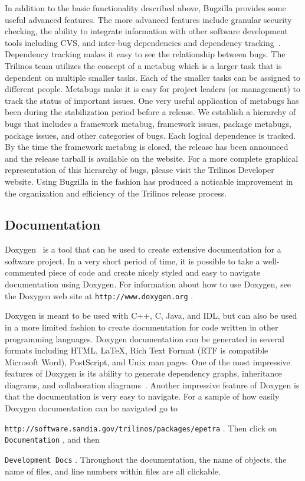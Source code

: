 \documentclass[12pt,relax]{article}
\newcommand{\InlineDirectory}[1]{
  {\hspace{0.01 in}} {\tt #1} {\hspace{0.01 in}}}
\begin{document}
In addition to the basic functionality described above, Bugzilla provides some 
useful advanced features.  The more advanced features include
granular security checking, the ability to integrate information with 
other software development tools including CVS, and inter-bug 
dependencies and dependency tracking~\cite{Bugzilla}.  Dependency tracking 
makes it easy to see the relationship 
between bugs.  The Trilinos team utilizes the concept of a metabug which 
is a larger task that is dependent on multiple smaller tasks.  Each of the 
smaller tasks can be assigned to different people. Metabugs make it is easy 
for project leaders (or management) to track the status of important issues. 
One very useful application of metabugs has been during the stabilization
period before a release.  We establish a hierarchy of bugs that includes
a framework metabug, framework issues, package metabugs, package issues,
and other categories of bugs.  
Each logical dependence is tracked.  By the time the framework metabug is 
closed, the release has been announced and the release tarball is available
on the website.  For a more complete graphical representation of this
hierarchy of bugs, please visit the Trilinos Developer website.  Using
Bugzilla in the fashion has produced a noticable improvement in the 
organization and efficiency of the Trilinos release process.

\subsection{Documentation}

Doxygen~\cite{Doxygen} is a tool that can be used to create 
extensive documentation for a software project.  In a very short period of 
time, it is possible to take a well-commented piece 
of code and create nicely styled and easy to navigate documentation using 
Doxygen.  For information about how to use 
Doxygen, see the Doxygen 
web site at \InlineDirectory{http://www.doxygen.org}.  

Doxygen is meant to be used with C++, C, Java, and IDL, but can also be used 
in a more limited fashion to create documentation for code written in other
programming languages.  Doxygen documentation 
can be generated in several formats including HTML, \LaTeX, Rich Text Format 
(RTF is compatible Microsoft Word), PostScript, and
Unix man pages.  One of the most impressive features of Doxygen is its ability 
to generate dependency graphs, inheritance diagrams, and collaboration 
diagrams~\cite{Doxygen}.  Another impressive feature of Doxygen is that the 
documentation is very easy to navigate.  For a sample of how easily Doxygen 
documentation can be navigated go to
\newline
\InlineDirectory{http://software.sandia.gov/trilinos/packages/epetra}.  Then
click on \InlineDirectory{Documentation}, and then 
\InlineDirectory{Development Docs}. 
Throughout the documentation, the name of objects, 
the name of files, and line numbers within files are all clickable.
\end{document}
